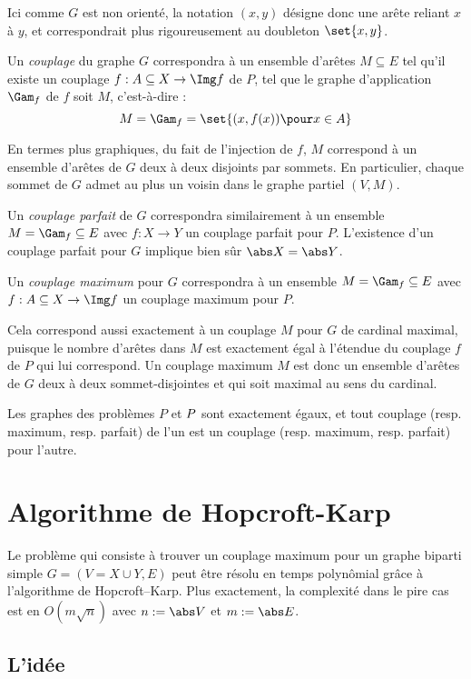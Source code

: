  Ici comme $G$ est non orienté, la notation $(x,y)$ désigne donc une arête reliant $x$ à $y$, et correspondrait plus rigoureusement au doubleton $\set{x,y}$.
 
 Un \emph{couplage} du graphe $G$ correspondra à un ensemble d'arêtes $M \subseteq E$ tel qu'il existe un couplage $f : A \subseteq X \to \Img f$ de $P$, tel que le graphe d'application $\Gam_f$ de $f$ soit $M$, c'est-à-dire :
 \[ M = \Gam_f = \set{ (x,f(x)) \pour x \in A } \]
 
 En termes plus graphiques, du fait de l'injection de $f$, $M$ correspond à un ensemble d'arêtes de $G$ deux à deux disjoints par sommets. En particulier, chaque sommet de $G$ admet au plus un voisin dans le graphe partiel $(V, M)$.
 
 Un \emph{couplage parfait} de $G$ correspondra similairement à un ensemble $M = \Gam_f \subseteq E$ avec $f : X \to Y$ un couplage parfait pour $P$. L'existence d'un couplage parfait pour $G$ implique bien sûr $\abs X = \abs Y$.
 
 Un \emph{couplage maximum} pour $G$ correspondra à un ensemble $M = \Gam_f \subseteq E$ avec $f : A \subseteq X \to \Img f$ un couplage maximum pour $P$.
 
 Cela correspond aussi exactement à un couplage $M$ pour $G$ de cardinal maximal, puisque le nombre d'arêtes dans $M$ est exactement égal à l'étendue du couplage $f$ de $P$ qui lui correspond. Un couplage maximum $M$ est donc un ensemble d'arêtes de $G$ deux à deux sommet-disjointes et qui soit maximal au sens du cardinal.
 \SEP
 
 Les graphes des problèmes $P$ et $P\-$ sont exactement égaux, et tout couplage (resp. maximum, resp. parfait) de l'un est un couplage (resp. maximum, resp. parfait) pour l'autre.
 
 \section{Algorithme de Hopcroft-Karp}
 
 Le problème qui consiste à trouver un couplage maximum pour un graphe biparti simple $G = (V = X \cup Y,E)$ peut être résolu en temps polynômial grâce à l'algorithme de Hopcroft–Karp. Plus exactement, la complexité dans le pire cas est en $O(m \sqrt n)$ avec $n := \abs V$ et $m := \abs E$.
 
 \subsection{L'idée}
 
